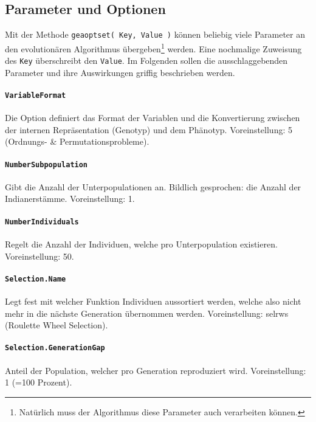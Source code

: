 \subsection{Parameter und Optionen}\label{sec.param}

Mit der Methode {\tt geaoptset( Key, Value )} können beliebig viele
Parameter an den evolutionären Algorithmus übergeben\footnote{Natürlich
muss der Algorithmus diese Parameter auch verarbeiten können.} werden.
Eine nochmalige Zuweisung des {\tt Key} überschreibt den {\tt Value}.
Im Folgenden sollen die ausschlaggebenden Parameter und
ihre Auswirkungen griffig beschrieben werden.


\paragraph{{\tt VariableFormat}} Die Option definiert das Format der Variablen
und die Konvertierung zwischen der internen Repräsentation (Genotyp) und dem
Phänotyp.
Voreinstellung: 5 (Ordnungs- \& Permutationsprobleme).

\paragraph{{\tt NumberSubpopulation}} Gibt die Anzahl der Unterpopulationen an.
Bildlich gesprochen: die Anzahl der Indianerstämme.
Voreinstellung: 1.

\paragraph{{\tt NumberIndividuals}} Regelt die Anzahl
der Individuen, welche pro Unterpopulation existieren.
Voreinstellung: 50.

\paragraph{{\tt Selection.Name}} Legt fest mit welcher Funktion Individuen
aussortiert werden, welche also nicht mehr in die nächste Generation
übernommen werden.
Voreinstellung: selrws (Roulette Wheel Selection).

\paragraph{{\tt Selection.GenerationGap}} Anteil der Population, welcher pro
Generation reproduziert wird.
Voreinstellung: 1 (=100 Prozent).

